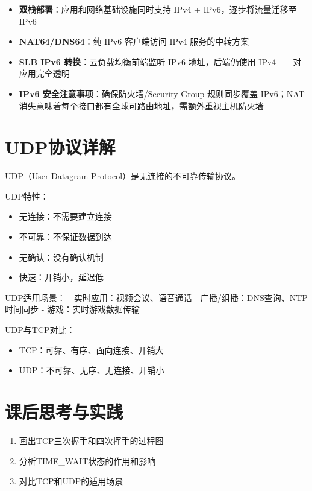 \documentclass[12pt,UTF8]{ctexbook}
\begin{document}
\begin{itemize}
    \item \textbf{双栈部署}：应用和网络基础设施同时支持 IPv4 + IPv6，逐步将流量迁移至 IPv6
    \item \textbf{NAT64/DNS64}：纯 IPv6 客户端访问 IPv4 服务的中转方案
    \item \textbf{SLB IPv6 转换}：云负载均衡前端监听 IPv6 地址，后端仍使用 IPv4——对应用完全透明
    \item \textbf{IPv6 安全注意事项}：确保防火墙/Security Group 规则同步覆盖 IPv6；NAT 消失意味着每个接口都有全球可路由地址，需额外重视主机防火墙
\end{itemize}

\section{UDP协议详解}
\label{sec:udp}

UDP（User Datagram Protocol）是无连接的不可靠传输协议。

UDP特性：
\begin{itemize}
    \item 无连接：不需要建立连接
    \item 不可靠：不保证数据到达
    \item 无确认：没有确认机制
    \item 快速：开销小，延迟低
\end{itemize}

UDP适用场景：
- 实时应用：视频会议、语音通话
- 广播/组播：DNS查询、NTP时间同步
- 游戏：实时游戏数据传输

UDP与TCP对比：
\begin{itemize}
    \item TCP：可靠、有序、面向连接、开销大
    \item UDP：不可靠、无序、无连接、开销小
\end{itemize}

\section{课后思考与实践}
\label{sec:network-practice}
\begin{enumerate}
    \item 画出TCP三次握手和四次挥手的过程图
    \item 分析TIME\_WAIT状态的作用和影响
    \item 对比TCP和UDP的适用场景
\end{enumerate}
\end{document}
